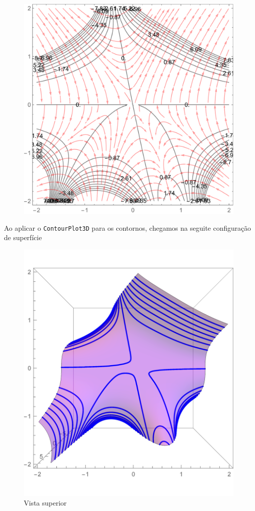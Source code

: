 \documentclass[a4paper, 12pt, brazilian]{article}
\begin{document}
	\begin{figure}[H]
		\centering
		\includegraphics[width=0.7\linewidth]{images/g15}
		\label{fig:g15}
	\end{figure}
	Ao aplicar o \texttt{ContourPlot3D} para os contornos, chegamos na seguite configuração de superfície
	
	\begin{figure}[H]
		\centering
		\includegraphics[width=0.6\linewidth]{images/g153d1}
		\caption{Vista superior}
	\end{figure}
\end{document}
